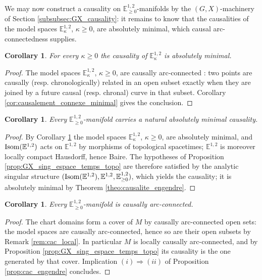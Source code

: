 \documentclass[a4paper,twoside]{article}
\newcommand{\mass}[1]{\mathbb{E}^{1,2}_{#1}}
\newtheorem{cor}[lem]{Corollary}
\begin{document}
We may now construct a causality on $\mass{\geq 0}$-manifolds by the $(G,X)$-machinery of Section
\ref{subsubsec:GX_causality}: it remains to know that the causalities of the model spaces
$\mass{\kappa}$, $\kappa \geq 0$, are absolutely minimal, which causal arc-connectedness supplies.

\begin{cor}\label{cor:model_minimal} For every $\kappa\geq 0$ the causality of $\mass{\kappa}$ is absolutely minimal.
\end{cor}
\begin{proof}
The model spaces $\mass{\kappa}$, $\kappa\geq 0$, are causally arc-connected
\cite{thesis,brunswic:hal-01317447}: two points are causally (resp. chronologically) related in an open
subset exactly when they are joined by a future causal (resp. chronal) curve in that subset.
Corollary \ref{cor:causalement_connexe_minimal} gives the conclusion.
\end{proof}

\begin{cor}\label{cor:massA_causalite} Every $\mass{\geq 0}$-manifold carries a natural absolutely minimal causality.
\end{cor}
\begin{proof}
By Corollary \ref{cor:model_minimal} the model spaces $\mass{\kappa}$, $\kappa\geq0$, are
absolutely minimal, and $\isom(\mass{})$ acts on $\mass{}$ by morphisms of topological
spacetimes; $\mass{}$ is moreover locally compact Hausdorff, hence Baire. The hypotheses of
Proposition \ref{prop:GX_sing_espace_temps_topo} are therefore satisfied by the analytic
singular structure $(\isom(\mass{}),\mass{},\mass{\geq0})$, which yields the causality; it is
absolutely minimal by Theorem \ref{theo:causalite_engendre}.
\end{proof}

\begin{cor}\label{cor:massA_cac} Every $\mass{\geq 0}$-manifold is causally arc-connected.
\end{cor}
\begin{proof}
The chart domains form a cover of $M$ by causally arc-connected open sets: the model spaces are
causally arc-connected, hence so are their open subsets by Remark \ref{rem:cac_local}. In particular
$M$ is locally causally arc-connected, and by Proposition \ref{prop:GX_sing_espace_temps_topo} its
causality is the one generated by that cover. Implication $(i)\Rightarrow(ii)$ of Proposition
\ref{prop:cac_engendre} concludes.
\end{proof}
\end{document}
